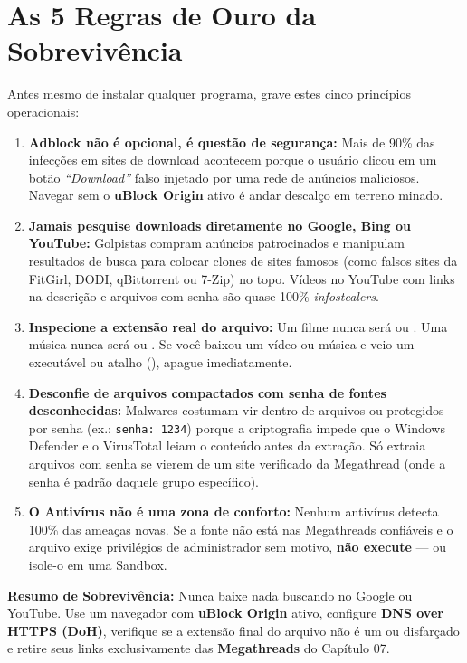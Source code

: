 \documentclass{pousadaguide}
\begin{document}
\section{As 5 Regras de Ouro da Sobrevivência}

Antes mesmo de instalar qualquer programa, grave estes cinco princípios operacionais:

\begin{enumerate}
  \item \textbf{Adblock não é opcional, é questão de segurança:} Mais de 90\% das infecções em sites de download acontecem porque o usuário clicou em um botão \emph{``Download''} falso injetado por uma rede de anúncios maliciosos. Navegar sem o \textbf{uBlock Origin} ativo é andar descalço em terreno minado.
  \item \textbf{Jamais pesquise downloads diretamente no Google, Bing ou YouTube:} Golpistas compram anúncios patrocinados e manipulam resultados de busca para colocar clones de sites famosos (como falsos sites da FitGirl, DODI, qBittorrent ou 7-Zip) no topo. Vídeos no YouTube com links na descrição e arquivos com senha são quase 100\% \emph{infostealers}.
  \item \textbf{Inspecione a extensão real do arquivo:} Um filme nunca será  ou . Uma música nunca será  ou . Se você baixou um vídeo ou música e veio um executável ou atalho (), apague imediatamente.
  \item \textbf{Desconfie de arquivos compactados com senha de fontes desconhecidas:} Malwares costumam vir dentro de arquivos  ou  protegidos por senha (ex.: \texttt{senha: 1234}) porque a criptografia impede que o Windows Defender e o VirusTotal leiam o conteúdo antes da extração. Só extraia arquivos com senha se vierem de um site verificado da Megathread (onde a senha é padrão daquele grupo específico).
  \item \textbf{O Antivírus não é uma zona de conforto:} Nenhum antivírus detecta 100\% das ameaças novas. Se a fonte não está nas Megathreads confiáveis e o arquivo exige privilégios de administrador sem motivo, \textbf{não execute} — ou isole-o em uma Sandbox.
\end{enumerate}

\begin{tldr}
\textbf{Resumo de Sobrevivência:} Nunca baixe nada buscando no Google ou YouTube. Use um navegador com \textbf{uBlock Origin} ativo, configure \textbf{DNS over HTTPS (DoH)}, verifique se a extensão final do arquivo não é um  ou  disfarçado e retire seus links exclusivamente das \textbf{Megathreads} do Capítulo 07.
\end{tldr}
\end{document}
